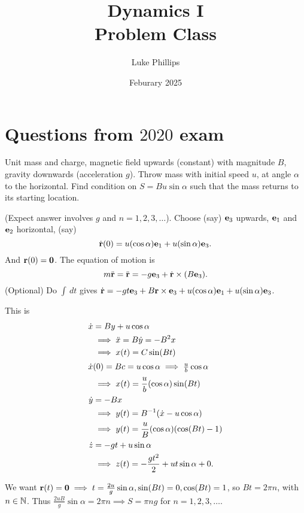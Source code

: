 \documentclass[10pt, a4paper]{article}
\title{Dynamics I \\
    \large Problem Class}
\author{Luke Phillips}
\date{Feburary 2025}
\begin{document}
\maketitle

\newpage

\tableofcontents

\newpage

\section{Questions from \texorpdfstring{$2020$}{} exam}

\begin{problem}
    Unit mass and charge,
    magnetic field upwards
    (constant)
    with magnitude $B$,
    gravity downwards
    (acceleration $g$).
    Throw mass with initial speed $u$,
    at angle $\alpha$ to the horizontal.
    Find condition on $S = Bu\sin{\alpha}$ such that the mass returns to its starting location.

    \begin{solution}
        (Expect answer involves $g$ and $n = 1, 2, 3, \dotsc$).
        Choose
        (say)
        $\mathbf{e}_3$ upwards,
        $\mathbf{e}_1$ and $\mathbf{e}_2$ horizontal,
        (say)
        \[
        \dot{\mathbf{r}}(0) = u(\cos{\alpha})\mathbf{e}_1 + u(\sin{\alpha})\mathbf{e}_3.
        \]
        And $\mathbf{r}(0) = \mathbf{0}$.
        The equation of motion is
        \[
        m\ddot{\mathbf{r}} = \ddot{\mathbf{r}} = -g\mathbf{e}_3 + \dot{\mathbf{r}} \times (B\mathbf{e}_3).
        \]
        (Optional)
        Do $\int\,dt$ gives $\dot{\mathbf{r}} = -gt\mathbf{e}_3 + B\mathbf{r} \times \mathbf{e}_3 + u(\cos{\alpha})\mathbf{e}_1 + u(\sin{\alpha})\mathbf{e}_3$.

        This is
        \begin{align*}
            \dot{x} &= By + u\cos{\alpha} \\
            &\implies \ddot{x} = B\dot{y} = -B ^ 2x \\
            &\implies x(t) = C\sin(Bt) \\
            \intertext{$\dot{x}(0) = Bc = u\cos{\alpha} \implies \frac{u}{b}\cos{\alpha}$}
            &\implies x(t) = \frac{u}{b}(\cos{\alpha})\sin(Bt) \\
            \dot{y} &= -Bx \\
            &\implies y(t) = B ^ {-1}(\dot{x} - u\cos{\alpha}) \\
            &\implies y(t) = \frac{u}{B}(\cos{\alpha})(\cos(Bt) - 1) \\
            \dot{z} &= -gt + u\sin{\alpha} \\
            &\implies z(t) = -\frac{gt ^ 2}{2} + ut\sin{\alpha} + 0.
        \end{align*}

        We want $\mathbf{r}(t) = \mathbf{0} \implies t = \frac{2u}{g}\sin{\alpha}, \sin(Bt) = 0, \cos(Bt) = 1$,
        so $Bt = 2\pi n$,
        with $n \in \mathbb{N}$.
        Thus $\frac{2uB}{g}\sin{\alpha} = 2\pi n \implies S = \pi n g$ for $n = 1, 2, 3, \dotsc$.
    \end{solution}
\end{problem}
\end{document}
